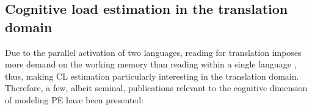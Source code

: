 \documentclass[output=paper]{langsci/langscibook}
\begin{document}



\subsection{Cognitive load estimation in the translation domain}
Due to the parallel activation of two languages, reading for translation imposes more demand on the working memory than reading within a single language \citep{macizo2006reading}, thus, making CL estimation particularly interesting in the translation domain. Therefore, a few, albeit seminal, publications relevant to the cognitive dimension of modeling PE have been presented:
\end{document}
